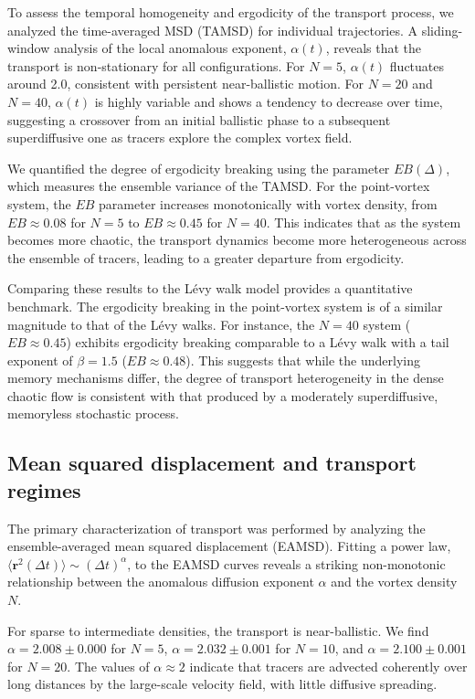 \documentclass[]{article}
\begin{document}
To assess the temporal homogeneity and ergodicity of the transport process, we analyzed the time-averaged MSD (TAMSD) for individual trajectories. A sliding-window analysis of the local anomalous exponent, $\alpha(t)$, reveals that the transport is non-stationary for all configurations. For $N=5$, $\alpha(t)$ fluctuates around 2.0, consistent with persistent near-ballistic motion. For $N=20$ and $N=40$, $\alpha(t)$ is highly variable and shows a tendency to decrease over time, suggesting a crossover from an initial ballistic phase to a subsequent superdiffusive one as tracers explore the complex vortex field.

We quantified the degree of ergodicity breaking using the parameter $EB(\Delta)$, which measures the ensemble variance of the TAMSD. For the point-vortex system, the $EB$ parameter increases monotonically with vortex density, from $EB \approx 0.08$ for $N=5$ to $EB \approx 0.45$ for $N=40$. This indicates that as the system becomes more chaotic, the transport dynamics become more heterogeneous across the ensemble of tracers, leading to a greater departure from ergodicity.

Comparing these results to the L\'evy walk model provides a quantitative benchmark. The ergodicity breaking in the point-vortex system is of a similar magnitude to that of the L\'evy walks. For instance, the $N=40$ system ($EB \approx 0.45$) exhibits ergodicity breaking comparable to a L\'evy walk with a tail exponent of $\beta=1.5$ ($EB \approx 0.48$). This suggests that while the underlying memory mechanisms differ, the degree of transport heterogeneity in the dense chaotic flow is consistent with that produced by a moderately superdiffusive, memoryless stochastic process.

\subsection{Mean squared displacement and transport regimes}

The primary characterization of transport was performed by analyzing the ensemble-averaged mean squared displacement (EAMSD). Fitting a power law, $\langle \mathbf{r}^2(\Delta t) \rangle \sim (\Delta t)^\alpha$, to the EAMSD curves reveals a striking non-monotonic relationship between the anomalous diffusion exponent $\alpha$ and the vortex density $N$.

For sparse to intermediate densities, the transport is near-ballistic. We find $\alpha = 2.008 \pm 0.000$ for $N=5$, $\alpha = 2.032 \pm 0.001$ for $N=10$, and $\alpha = 2.100 \pm 0.001$ for $N=20$. The values of $\alpha \approx 2$ indicate that tracers are advected coherently over long distances by the large-scale velocity field, with little diffusive spreading.
\end{document}
